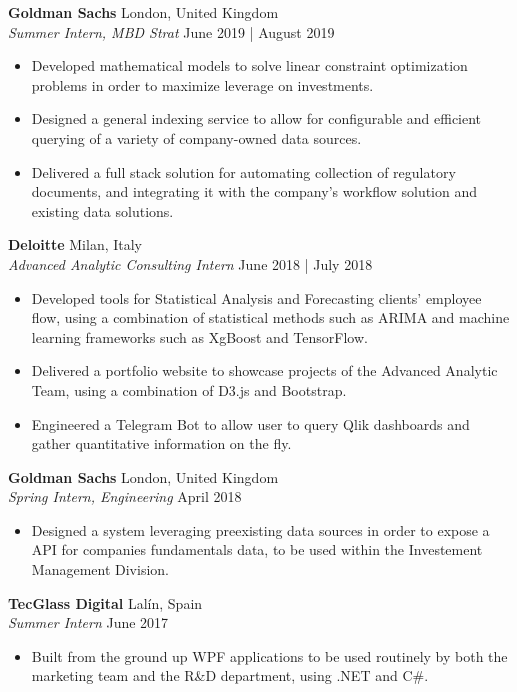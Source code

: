 \documentclass[a4paper]{article}
\begin{document}
\textbf{Goldman Sachs} \hfill London, United Kingdom \\
\textit{Summer Intern, MBD Strat} \hfill{June 2019 | August 2019}
\vspace{-1mm}
\begin{itemize} \itemsep 1pt
    \item Developed mathematical models to solve linear constraint optimization problems in order to maximize leverage on investments.
    \item Designed a general indexing service to allow for configurable and efficient querying of a variety of company-owned data sources.
    \item Delivered a full stack solution for automating collection of regulatory documents, and integrating it with the company's workflow solution and existing data solutions.
\end{itemize}

\textbf{Deloitte} \hfill Milan, Italy\\
\textit{Advanced Analytic Consulting Intern} \hfill June 2018 | July 2018\\
\vspace{-1mm}
\begin{itemize} \itemsep 1pt
    \item Developed tools for Statistical Analysis and Forecasting clients' employee flow, using a combination of statistical methods such as ARIMA and machine learning frameworks such as XgBoost and TensorFlow.
    \item Delivered a portfolio website to showcase projects of the Advanced Analytic Team, using a combination of D3.js and Bootstrap.
    \item Engineered a Telegram Bot to allow user to query Qlik dashboards and gather quantitative information on the fly.
\end{itemize}

\textbf{Goldman Sachs} \hfill London, United Kingdom\\
\textit{Spring Intern, Engineering} \hfill April 2018\\
\begin{itemize} \itemsep 1pt
    \item Designed a system leveraging preexisting data sources in order to expose a API for companies fundamentals data, to be used within the Investement Management Division.
\end{itemize}

\textbf{TecGlass Digital} \hfill Lalín, Spain\\
\textit{Summer Intern} \hfill June 2017\\
\begin{itemize} \itemsep 1pt
    \item Built from the ground up WPF applications to be used routinely by both the marketing team and the R\&D department, using .NET and C\#.
\end{itemize}
\end{document}
